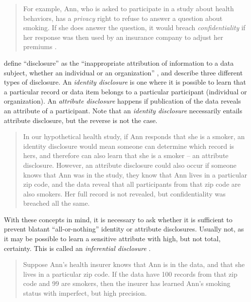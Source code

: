 \documentclass[
]{WileySix}
\begin{document}
\begin{quote}
For example, Ann, who is asked to participate in a study about health behaviors, has a \emph{privacy} right to refuse to answer a question about smoking. If she does answer the question, it would breach \emph{confidentiality} if her response was then used by an insurance company to adjust her premiums \citep{duncan_private_1993}.
\end{quote}

\citet{harris-kojetin_statistical_2005} define ``disclosure'' as the ``inappropriate attribution of information to a data subject, whether an individual or an organization'' \citep[p.~4]{harris-kojetin_statistical_2005}, and describe three different types of disclosure. An \emph{identity disclosure} is one where it is possible to learn that a particular record or data item belongs to a particular participant (individual or organization). An \emph{attribute disclosure} happens if publication of the data reveals an attribute of a participant. Note that an \emph{identity disclosure} necessarily entails attribute disclosure, but the reverse is not the case.

\begin{quote}
In our hypothetical health study, if Ann responds that she is a smoker, an identity disclosure would mean someone can determine which record is hers, and therefore can also learn that she is a smoker -- an attribute disclosure. However, an attribute disclosure could also occur if someone knows that Ann was in the study, they know that Ann lives in a particular zip code, and the data reveal that all participants from that zip code are also smokers. Her full record is not revealed, but confidentiality was breached all the same.
\end{quote}

With these concepts in mind, it is necessary to ask whether it is sufficient to prevent blatant ``all-or-nothing'' identity or attribute disclosures. Usually not, as it may be possible to learn a sensitive attribute with high, but not total, certainty. This is called an \emph{inferential disclosure} \citep{dalenius_towards_1977, duncan_disclosure-limited_1986}.

\begin{quote}
Suppose Ann's health insurer knows that Ann is in the data, and that she lives in a particular zip code. If the data have 100 records from that zip code and 99 are smokers, then the insurer has learned Ann's smoking status with imperfect, but high precision.
\end{quote}
\end{document}
